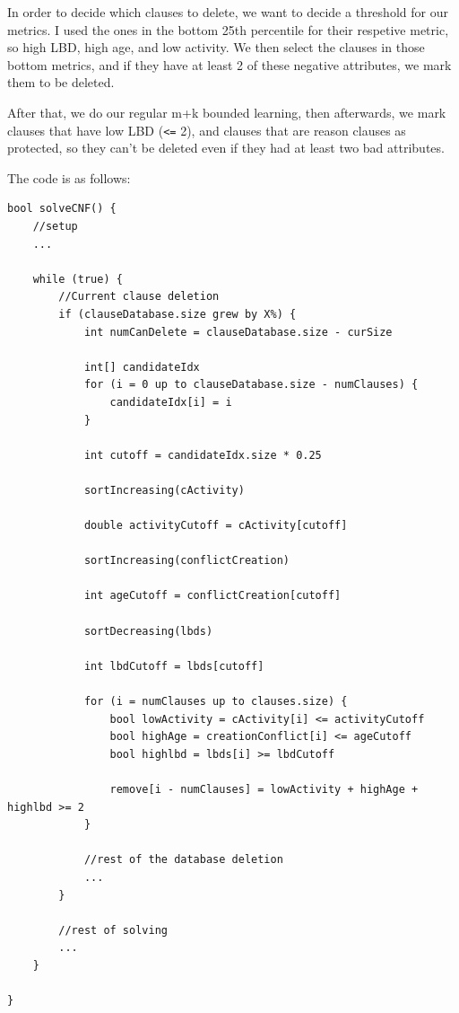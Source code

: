 \documentclass[oneside]{book}
\begin{document}
In order to decide which clauses to delete, we want to decide a threshold for our 
metrics. I used the ones in the bottom 25th percentile for their respetive metric, 
so high LBD, high age, and low activity. We then select the clauses in those 
bottom metrics, and if they have at least 2 of these negative attributes, we mark 
them to be deleted. 

After that, we do our regular m+k bounded learning, then afterwards, we mark clauses 
that have low LBD (\verb|<=| 2), and clauses that are reason clauses as protected, 
so they can't be deleted even if they had at least two bad attributes.

The code is as follows:
\begin{lstlisting}
bool solveCNF() {
    //setup
    ... 

    while (true) {
        //Current clause deletion
        if (clauseDatabase.size grew by X%) {
            int numCanDelete = clauseDatabase.size - curSize

            int[] candidateIdx
            for (i = 0 up to clauseDatabase.size - numClauses) {
                candidateIdx[i] = i
            }

            int cutoff = candidateIdx.size * 0.25

            sortIncreasing(cActivity)

            double activityCutoff = cActivity[cutoff]

            sortIncreasing(conflictCreation)

            int ageCutoff = conflictCreation[cutoff]

            sortDecreasing(lbds)

            int lbdCutoff = lbds[cutoff]

            for (i = numClauses up to clauses.size) {
                bool lowActivity = cActivity[i] <= activityCutoff
                bool highAge = creationConflict[i] <= ageCutoff
                bool highlbd = lbds[i] >= lbdCutoff

                remove[i - numClauses] = lowActivity + highAge + highlbd >= 2
            }

            //rest of the database deletion
            ...
        }

        //rest of solving
        ...
    }

}
\end{lstlisting}
\end{document}
